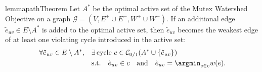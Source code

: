 \begin{restatable}{lemma}{pathTheorem}\label{lemma:pathTheorem}
Let $A^*$ be the optimal active set of the Mutex Watershed Objective on a graph $\mathcal{G} = (V, E^+ \cup E^-, W^+\cup W^-)$. 
If an additional edge $\tilde{e}_{uv} \in E\setminus A^*$ is added to the optimal active set, then $\tilde{e}_{uv}$ becomes the weakest edge of at least one violating cycle introduced in the active set:
\begin{align}
\begin{split}
\forall \tilde{e}_{uv} \in E\setminus A^*, \quad &\exists \,\mathrm{cycle}\,\, c \in \mathcal{C}_{0/1}(A^* \cup \{\tilde{e}_{uv}\})  \\ 
& \mathrm{s.t.} \quad \tilde{e}_{uv} \in c  \quad \mathrm{and} \quad \tilde{e}_{uv} = \argmin_{e\in c}  w(e). \label{eq:reduced_path_ineq_orig}
\end{split}
\end{align} 
\end{restatable}

